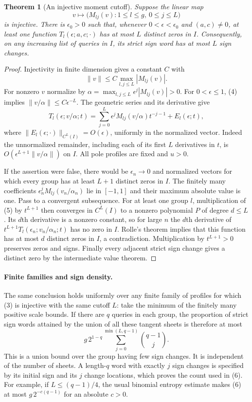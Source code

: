 \documentclass[11pt]{article}
\newtheorem{theorem}{Theorem}
\begin{document}
\begin{theorem}[An injective moment cutoff]
Suppose the linear map
\[
 v\longmapsto\bigl(M_{lj}(v):1\leq l\leq g,\ 0\leq j\leq L\bigr)
                                                               \tag{3}
\]
is injective. There is $\epsilon_0>0$ such that, whenever
$0<\epsilon<\epsilon_0$ and $(a,c)\ne0$, at least one function
$T_l(\epsilon;a,c;\cdot)$ has at most $L$ distinct zeros in $I$.
Consequently, on any increasing list of queries in $I$, its strict
sign word has at most $L$ sign changes.
\end{theorem}
\begin{proof}
Injectivity in finite dimension gives a constant $C$ with
\[
 \|v\|\leq C\max_{l,j\leq L}|M_{lj}(v)|.                    \tag{4}
\]
For nonzero $v$ normalize by
$\alpha=\max_{l,j\leq L}\epsilon^j|M_{lj}(v)|>0$.
For $0<\epsilon\leq1$, (4) implies
$\|v/\alpha\|\leq C\epsilon^{-L}$.
The geometric series and its derivative give
\[
 T_l(\epsilon;v/\alpha;t)
   =\sum_{j=0}^L\epsilon^jM_{lj}(v/\alpha)t^{-j-1}
       +E_l(\epsilon;t),                                    \tag{5}
\]
where $\|E_l(\epsilon;\cdot)\|_{C^L(I)}=O(\epsilon)$,
uniformly in the normalized vector. Indeed the unnormalized
remainder, including each of its first $L$ derivatives in $t$, is
$O(\epsilon^{L+1}\|v/\alpha\|)$ on $I$. All pole profiles are
fixed and $u>0$.

If the assertion were false, there would be $\epsilon_n\to0$ and
normalized vectors for which every group has at least $L+1$
distinct zeros in $I$. The finitely many coefficients
$\epsilon_n^jM_{lj}(v_n/\alpha_n)$ lie in $[-1,1]$ and their
maximum absolute value is one. Pass to a convergent subsequence.
For at least one group $l$, multiplication of (5) by $t^{L+1}$
then converges in $C^L(I)$ to a nonzero polynomial $P$ of degree
$d\leq L$. Its $d$th derivative is a nonzero constant, so for
large $n$ the $d$th derivative of
$t^{L+1}T_l(\epsilon_n;v_n/\alpha_n;t)$ has no zero in $I$.
Rolle's theorem implies that this function has at most $d$ distinct
zeros in $I$, a contradiction. Multiplication by $t^{L+1}>0$
preserves zeros and signs. Finally every adjacent strict sign change
gives a distinct zero by the intermediate value theorem.
\end{proof}

\paragraph{Finite families and sign density.}
The same conclusion holds uniformly over any finite family of profiles
for which (3) is injective with the same cutoff $L$: take the minimum
of the finitely many positive scale bounds. If there are $q$ queries
in each group, the proportion of strict sign words attained by the
union of all these tangent sheets is therefore at most
\[
 g\,2^{1-q}\sum_{j=0}^{\min(L,q-1)}\binom{q-1}{j}.            \tag{6}
\]
This is a union bound over the group having few sign changes. It is
independent of the number of sheets. A length-$q$ word with exactly
$j$ sign changes is specified by its initial sign and its $j$
change locations, which proves the count used in (6).
For example, if $L\leq(q-1)/4$, the usual binomial entropy estimate
makes (6) at most $g\,2^{-c(q-1)}$ for an absolute $c>0$.
\end{document}
